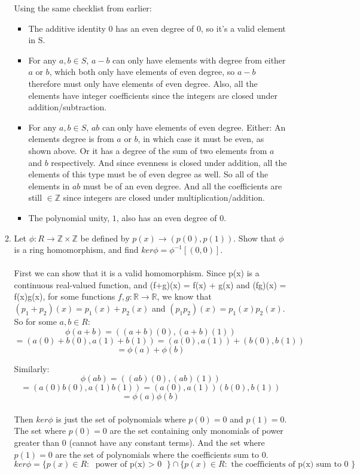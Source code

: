 \begin{enumerate}
\begin{enumerate}
          Using the same checklist from earlier:
          \begin{itemize}
            \item The additive identity $0$ has an even degree of 0, so it's a valid element in S.
            \item For any $a,b \in S$, $a-b$ can only have elements with degree from either $a$ or $b$, which both only have elements of even degree, so $a-b$ therefore must only have elements of even degree. Also, all the elements have integer coefficients since the integers are closed under addition/subtraction.
            \item For any $a,b \in S$, $ab$ can only have elements of even degree. Either: An elements degree is from $a$ or $b$, in which case it must be even, as shown above. Or it has a degree of the sum of two elements from $a$ and $b$ respectively. And since evenness is closed under addition, all the elements of this type must be of even degree as well. So all of the elements in $ab$ must be of an even degree. And all the coefficients are still $\in \mathds{Z}$ since integers are closed under multiplication/addition.
            \item The polynomial unity, $1$, also has an even degree of 0.
          \end{itemize}
        \item Let $\phi : R \rightarrow \mathds{Z} \times \mathds{Z}$ be defined by $p(x) \rightarrow (p(0), p(1))$. Show that $\phi$ is a ring homomorphism, and find $ker \phi = \phi^{-1}[{(0,0)}]$.\\\\

          First we can show that it is a valid homomorphism. Since p(x) is a continuous real-valued function, and (f+g)(x) = f(x) + g(x) and (fg)(x) = f(x)g(x), for some functions $f,g : \mathds{R} \rightarrow \mathds{R}$, we know that $(p_1+p_2)(x) = p_1(x)+p_2(x)$ and $(p_1p_2)(x) = p_1(x)p_2(x)$. So for some $a,b \in R$: 
          $$\phi(a+b) = ((a+b)(0), (a+b)(1))$$
          $$=(a(0)+b(0), a(1)+b(1)) = (a(0),a(1)) + (b(0),b(1))$$
          $$=\phi(a)+\phi(b)$$

          Similarly:
          $$\phi(ab) = ((ab)(0), (ab)(1))$$
          $$=(a(0)b(0), a(1)b(1)) = (a(0),a(1))(b(0),b(1))$$
          $$=\phi(a)\phi(b)$$\\

          Then $ker \phi$ is just the set of polynomials where $p(0) = 0$ and $p(1) = 0$. The set where $p(0) = 0$ are the set containing only monomials of power greater than 0 (cannot have any constant terms). And the set where $p(1) = 0$ are the set of polynomials where the coefficients sum to 0.
          $$ker \phi = \{p(x) \in R : \text{ power of p(x) $>$ 0 }\} \cap \{p(x) \in R : \text { the coefficients of p(x) sum to 0 }\}$$
  \end{enumerate}
\end{enumerate}

